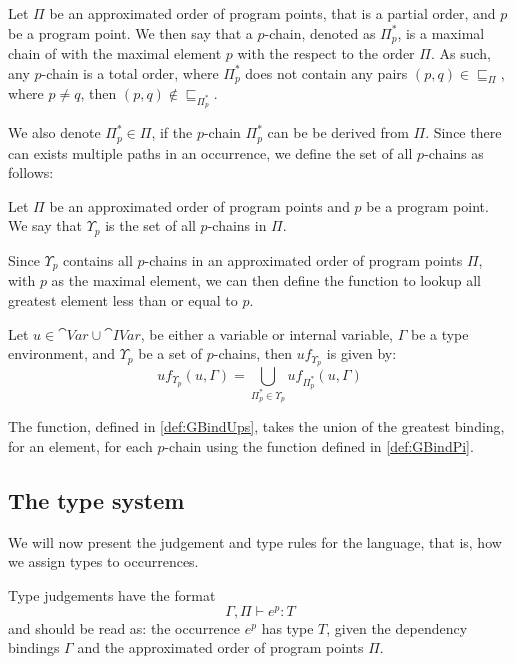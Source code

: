 \documentclass[acmsmall,sigplan]{acmart}
\begin{document}
\begin{definition}[$p$-chains]
	Let $\Pi$ be an approximated order of program points, that is a partial order, and $p$ be a program point.
	We then say that a $p$-chain, denoted as $\Pi_p^{*}$, is a maximal chain of with the maximal element $p$ with the respect to the order $\Pi$.
	As such, any $p$-chain is a total order, where $\Pi_p^{*}$ does not contain any pairs $(p,q)\in\sqsubseteq_\Pi$, where $p\neq q$, then $(p,q)\notin\sqsubseteq_{\Pi_p^{*}}$.
\end{definition}

We also denote $\Pi_p^{*}\in\Pi$, if the $p$-chain $\Pi_p^{*}$ can be be derived from $\Pi$.
Since there can exists multiple paths in an occurrence, we define the set of all $p$-chains as follows:

\begin{definition}[]
	Let $\Pi$ be an approximated order of program points and $p$ be a program point.
	We say that $\Upsilon_p$ is the set of all $p$-chains in $\Pi$.
\end{definition}

Since $\Upsilon_p$ contains all $p$-chains in an approximated order of program points $\Pi$, with $p$ as the maximal element, we can then define the function to lookup all greatest element less than or equal to $p$.

\begin{definition}[]\label{def:GBindUps}
	Let $u\in \cat{Var}\cup\cat{IVar}$, be either a variable or internal variable, $\Gamma$ be a type environment, and $\Upsilon_p$ be a set of $p$-chains, then $uf_{\Upsilon_p}$ is given by:
	$$uf_{\Upsilon_p}(u,\Gamma)=\bigcup_{\Pi_p^{*}\in\Upsilon_p}uf_{\Pi_p^{*}}(u,\Gamma)$$
\end{definition}

The function, defined in \cref{def:GBindUps}, takes the union of the greatest binding, for an element, for each $p$-chain using the function defined in \cref{def:GBindPi}.

\subsection{The type system}\label{sec:Judge}
We will now present the judgement and type rules for the language, that is, how we assign types to occurrences.

Type judgements have the format
%
\[ \Gamma,\Pi\vdash e^p: T \]
%
and should be read as: the occurrence $e^p$ has type $T$, given the
dependency bindings $\Gamma$ and the approximated order of program
points $\Pi$. 
\end{document}
